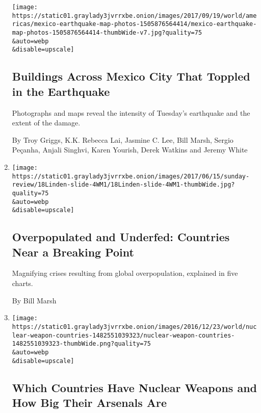 \begin{enumerate}
  \texttt{[image: https://static01.graylady3jvrrxbe.onion/images/2017/09/19/world/americas/mexico-earthquake-map-photos-1505876564414/mexico-earthquake-map-photos-1505876564414-thumbWide-v7.jpg?quality=75\\\&auto=webp\\\&disable=upscale]}

  \hypertarget{buildings-across-mexico-city-that-toppled-in-the-earthquake}{%
  \subsection{Buildings Across Mexico City That Toppled in the
  Earthquake}\label{buildings-across-mexico-city-that-toppled-in-the-earthquake}}

  Photographs and maps reveal the intensity of Tuesday's earthquake and
  the extent of the damage.

  By Troy Griggs, K.K. Rebecca Lai, Jasmine C. Lee, Bill Marsh, Sergio
  Peçanha, Anjali Singhvi, Karen Yourish, Derek Watkins and Jeremy White
\item
  \href{/interactive/2017/06/15/sunday-review/overpopulated-and-underfed-countries-near-a-breaking-point.html}{}

  \texttt{[image: https://static01.graylady3jvrrxbe.onion/images/2017/06/15/sunday-review/18Linden-slide-4WM1/18Linden-slide-4WM1-thumbWide.jpg?quality=75\\\&auto=webp\\\&disable=upscale]}

  \hypertarget{overpopulated-and-underfed-countries-near-a-breaking-point}{%
  \subsection{Overpopulated and Underfed: Countries Near a Breaking
  Point}\label{overpopulated-and-underfed-countries-near-a-breaking-point}}

  Magnifying crises resulting from global overpopulation, explained in
  five charts.

  By Bill Marsh
\item
  \href{/interactive/2016/12/23/world/nuclear-weapon-countries.html}{}

  \texttt{[image: https://static01.graylady3jvrrxbe.onion/images/2016/12/23/world/nuclear-weapon-countries-1482551039323/nuclear-weapon-countries-1482551039323-thumbWide.png?quality=75\\\&auto=webp\\\&disable=upscale]}

  \hypertarget{which-countries-have-nuclear-weapons-and-how-big-their-arsenals-are}{%
  \subsection{Which Countries Have Nuclear Weapons and How Big Their
  Arsenals
  Are}\label{which-countries-have-nuclear-weapons-and-how-big-their-arsenals-are}}


\end{enumerate}

